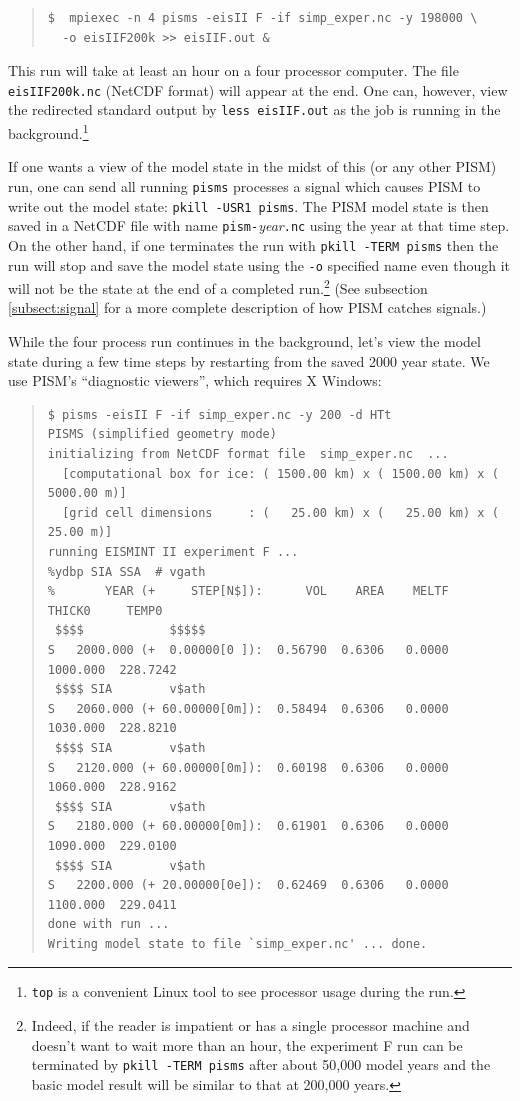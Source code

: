 \documentclass[11pt,final]{amsart}
\renewcommand{\t}[1]{\texttt{#1}}
\begin{document}
\small\begin{quote}\begin{verbatim}
$  mpiexec -n 4 pisms -eisII F -if simp_exper.nc -y 198000 \
  -o eisIIF200k >> eisIIF.out &
\end{verbatim}
\end{quote}\normalsize

This run will take at least an hour on a four processor computer.  The file \verb|eisIIF200k.nc| (NetCDF format) will appear at the end.  One can, however, view the redirected standard output by \verb|less eisIIF.out| as the job is running in the background.\footnote{\t{top} is a convenient Linux tool to see processor usage during the run.}

If one wants a view of the model state in the midst of this (or any other PISM) run, one can send all running \verb|pisms| processes a signal which causes PISM to write out the model state: \verb|pkill -USR1 pisms|.  The PISM model state is then saved in a NetCDF file with name \verb|pism-|\emph{year}\verb|.nc| using the year at that time step.  On the other hand, if one terminates the run with \verb|pkill -TERM pisms| then the run will stop and save the model state using the \verb|-o| specified name even though it will not be the state at the end of a completed run.\footnote{Indeed, if the reader is impatient or has a single processor machine and doesn't want to wait more than an hour, the experiment F run can be terminated by \t{pkill -TERM pisms} after about 50,000 model years and the basic model result will be similar to that at 200,000 years.}  (See subsection \ref{subsect:signal} for a more complete description of how PISM catches signals.)

While the four process run continues in the background, let's view the model state during a few time steps by restarting from the saved 2000 year state.  We use PISM's ``diagnostic viewers'', which requires X Windows:

\small\begin{quote}\begin{verbatim}
$ pisms -eisII F -if simp_exper.nc -y 200 -d HTt
PISMS (simplified geometry mode)
initializing from NetCDF format file  simp_exper.nc  ...
  [computational box for ice: ( 1500.00 km) x ( 1500.00 km) x ( 5000.00 m)]
  [grid cell dimensions     : (   25.00 km) x (   25.00 km) x (   25.00 m)]
running EISMINT II experiment F ...
%ydbp SIA SSA  # vgath
%       YEAR (+     STEP[N$]):      VOL    AREA    MELTF     THICK0     TEMP0
 $$$$            $$$$$
S   2000.000 (+  0.00000[0 ]):  0.56790  0.6306   0.0000   1000.000  228.7242
 $$$$ SIA        v$ath
S   2060.000 (+ 60.00000[0m]):  0.58494  0.6306   0.0000   1030.000  228.8210
 $$$$ SIA        v$ath
S   2120.000 (+ 60.00000[0m]):  0.60198  0.6306   0.0000   1060.000  228.9162
 $$$$ SIA        v$ath
S   2180.000 (+ 60.00000[0m]):  0.61901  0.6306   0.0000   1090.000  229.0100
 $$$$ SIA        v$ath
S   2200.000 (+ 20.00000[0e]):  0.62469  0.6306   0.0000   1100.000  229.0411
done with run ... 
Writing model state to file `simp_exper.nc' ... done.
\end{verbatim}
\end{quote}\normalsize
\end{document}
